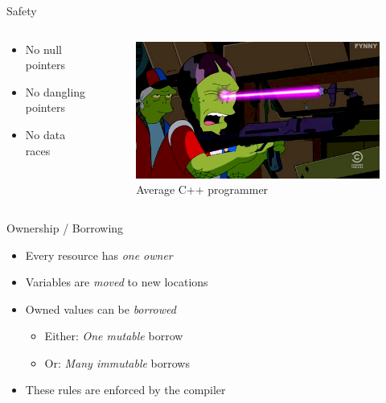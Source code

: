 \documentclass[aspectratio=1610,t]{beamer}
\begin{document}
\begin{frame}[c]{Safety}
  \begin{columns}[onlytextwidth]
    \begin{column}{.3\textwidth}
      \begin{itemize}
        \item No null pointers
        \item No dangling pointers
        \item No data races
      \end{itemize}
    \end{column}
    \begin{column}{.7\textwidth}
      \begin{figure}
        \includegraphics[width=\textwidth]{./average_cpp_programmer.png}
        \caption{Average C++ programmer}
      \end{figure}
    \end{column}
  \end{columns}
\end{frame}


\begin{frame}[c]{Ownership / Borrowing}
  \begin{itemize}
    \item Every resource has \emph{one owner}
    \item Variables are \emph{moved} to new locations
    \item Owned values can be \emph{borrowed}
      \begin{itemize}
        \item{Either: \emph{One mutable} borrow}
        \item{Or: \emph{Many immutable} borrows}
      \end{itemize}
    \item These rules are enforced by the compiler
  \end{itemize}
\end{frame}
\end{document}
